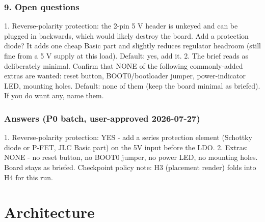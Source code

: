 \documentclass[11pt,a4paper]{article}
\begin{document}
\subsubsection*{9. Open questions}
1. Reverse-polarity protection: the 2-pin 5 V header is unkeyed and can be plugged in backwards, which would likely destroy the board. Add a protection diode? It adds one cheap Basic part and slightly reduces regulator headroom (still fine from a 5 V supply at this load). Default: yes, add it. 2. The brief reads as deliberately minimal. Confirm that NONE of the following commonly-added extras are wanted: reset button, BOOT0/bootloader jumper, power-indicator LED, mounting holes. Default: none of them (keep the board minimal as briefed). If you do want any, name them.

\subsubsection*{Answers (P0 batch, user-approved 2026-07-27)}
1. Reverse-polarity protection: YES - add a series protection element (Schottky diode or P-FET, JLC Basic part) on the 5V input before the LDO. 2. Extras: NONE - no reset button, no BOOT0 jumper, no power LED, no mounting holes. Board stays as briefed. Checkpoint policy note: H3 (placement render) folds into H4 for this run.

\section{Architecture}
\end{document}
